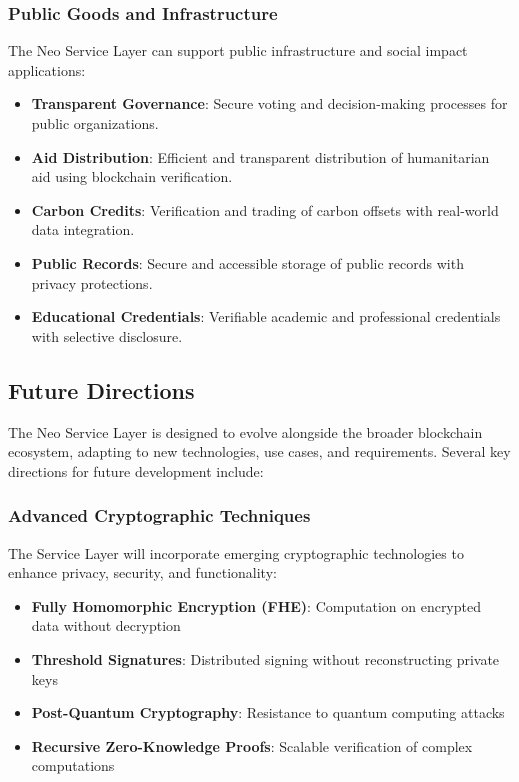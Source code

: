 \subsubsection{Public Goods and Infrastructure}
\label{subsubsec:public-goods}

The Neo Service Layer can support public infrastructure and social impact applications:

\begin{itemize}
    \item \textbf{Transparent Governance}: Secure voting and decision-making processes for public organizations.
    
    \item \textbf{Aid Distribution}: Efficient and transparent distribution of humanitarian aid using blockchain verification.
    
    \item \textbf{Carbon Credits}: Verification and trading of carbon offsets with real-world data integration.
    
    \item \textbf{Public Records}: Secure and accessible storage of public records with privacy protections.
    
    \item \textbf{Educational Credentials}: Verifiable academic and professional credentials with selective disclosure.
\end{itemize}

\subsection{Future Directions}
\label{subsec:nsl-future}

The Neo Service Layer is designed to evolve alongside the broader blockchain ecosystem, adapting to new technologies, use cases, and requirements. Several key directions for future development include:

\subsubsection{Advanced Cryptographic Techniques}
\label{subsubsec:advanced-crypto}

The Service Layer will incorporate emerging cryptographic technologies to enhance privacy, security, and functionality:

\begin{itemize}
    \item \textbf{Fully Homomorphic Encryption (FHE)}: Computation on encrypted data without decryption
    \item \textbf{Threshold Signatures}: Distributed signing without reconstructing private keys
    \item \textbf{Post-Quantum Cryptography}: Resistance to quantum computing attacks
    \item \textbf{Recursive Zero-Knowledge Proofs}: Scalable verification of complex computations
\end{itemize}

